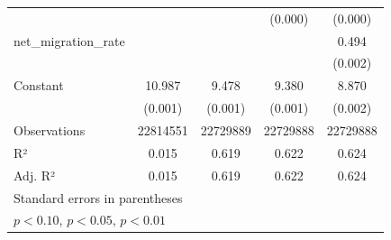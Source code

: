 \begin{table}[htbp]
\begin{tabular}{l*{4}{c}}
                    &                     &                     &     (0.000)         &     (0.000)         \\
\addlinespace
net\_migration\_rate  &                     &                     &                     &       0.494\sym{***}\\
                    &                     &                     &                     &     (0.002)         \\
\addlinespace
Constant            &      10.987\sym{***}&       9.478\sym{***}&       9.380\sym{***}&       8.870\sym{***}\\
                    &     (0.001)         &     (0.001)         &     (0.001)         &     (0.002)         \\
\midrule
Observations        &    22814551         &    22729889         &    22729888         &    22729888         \\
R²                  &       0.015         &       0.619         &       0.622         &       0.624         \\
Adj. R²             &       0.015         &       0.619         &       0.622         &       0.624         \\
\bottomrule
\multicolumn{5}{l}{\footnotesize Standard errors in parentheses}\\
\multicolumn{5}{l}{\footnotesize \sym{*} \(p<0.10\), \sym{**} \(p<0.05\), \sym{***} \(p<0.01\)}\\
\end{tabular}
\end{table}

